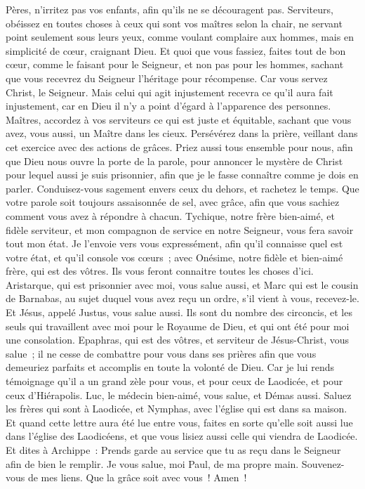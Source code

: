 \begin{multicols}{2}
Pères, n'irritez pas vos enfants, afin qu'ils ne se découragent pas.
Serviteurs, obéissez en toutes choses à ceux qui sont vos maîtres selon la chair, ne servant point seulement sous leurs yeux, comme voulant complaire aux hommes, mais en simplicité de cœur, craignant Dieu.
Et quoi que vous fassiez, faites tout de bon cœur, comme le faisant pour le Seigneur, et non pas pour les hommes,
sachant que vous recevrez du Seigneur l'héritage pour récompense. Car vous servez Christ, le Seigneur.
Mais celui qui agit injustement recevra ce qu'il aura fait injustement, car en Dieu il n'y a point d'égard à l'apparence des personnes.
\VerseOne{}Maîtres, accordez à vos serviteurs ce qui est juste et équitable, sachant que vous avez, vous aussi, un Maître dans les cieux.
Persévérez dans la prière, veillant dans cet exercice avec des actions de grâces.
Priez aussi tous ensemble pour nous, afin que Dieu nous ouvre la porte de la parole, pour annoncer le mystère de Christ pour lequel aussi je suis prisonnier, 
afin que je le fasse connaître comme je dois en parler.
Conduisez-vous sagement envers ceux du dehors, et rachetez le temps.
Que votre parole soit toujours assaisonnée de sel, avec grâce, afin que vous sachiez comment vous avez à répondre à chacun.
Tychique, notre frère bien-aimé, et fidèle serviteur, et mon compagnon de service en notre Seigneur, vous fera savoir tout mon état.
Je l'envoie vers vous expressément, afin qu'il connaisse quel est votre état, et qu'il console vos cœurs~;
avec Onésime, notre fidèle et bien-aimé frère, qui est des vôtres. Ils vous feront connaitre toutes les choses d'ici.
Aristarque, qui est prisonnier avec moi, vous salue aussi, et Marc qui est le cousin de Barnabas, au sujet duquel vous avez reçu un ordre, s'il vient à vous, recevez-le.
Et Jésus, appelé Justus, vous salue aussi. Ils sont du nombre des circoncis, et les seuls qui travaillent avec moi pour le Royaume de Dieu, et qui ont été pour moi une consolation.
Epaphras, qui est des vôtres, et serviteur de Jésus-Christ, vous salue~; il ne cesse de combattre pour vous dans ses prières afin que vous demeuriez parfaits et accomplis en toute la volonté de Dieu.
Car je lui rends témoignage qu'il a un grand zèle pour vous, et pour ceux de Laodicée, et pour ceux d'Hiérapolis.
Luc, le médecin bien-aimé, vous salue, et Démas aussi.
Saluez les frères qui sont à Laodicée, et Nymphas, avec l'église qui est dans sa maison.
Et quand cette lettre aura été lue entre vous, faites en sorte qu'elle soit aussi lue dans l'église des Laodicéens, et que vous lisiez aussi celle qui viendra de Laodicée.
Et dites à Archippe~: Prends garde au service que tu as reçu dans le Seigneur afin de bien le remplir.
Je vous salue, moi Paul, de ma propre main. Souvenez-vous de mes liens. Que la grâce soit avec vous~! Amen~!
\PPE{}
\end{multicols}
